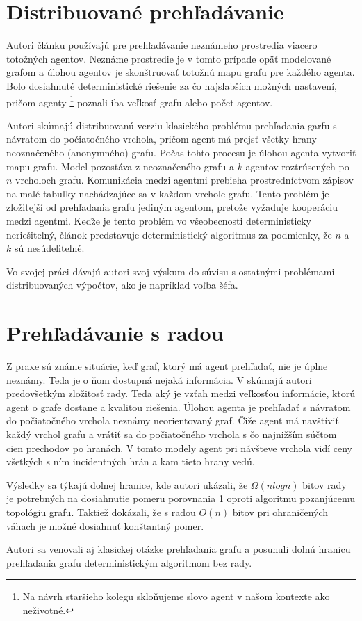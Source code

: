\section{Distribuované prehľadávanie}
Autori článku \cite{DEA} používajú pre prehľadávanie neznámeho prostredia
viacero totožných agentov. Neznáme prostredie je v tomto prípade opäť
modelované grafom a úlohou agentov je skonštruovať totožnú mapu grafu pre
každého agenta. Bolo dosiahnuté deterministické riešenie za čo najslabších možných
nastavení, pričom agenty \footnote{Na návrh staršieho kolegu skloňujeme
slovo agent v našom kontexte ako neživotné.} poznali iba veľkosť grafu alebo
počet agentov.

Autori skúmajú distribuovanú verziu
klasického problému prehľadania garfu s návratom do počiatočného vrchola,
pričom agent má prejsť všetky hrany neoznačeného (anonymného) grafu. Počas
tohto procesu je úlohou agenta vytvoriť mapu grafu. Model pozostáva z
neoznačeného grafu a $k$ agentov roztrúsených po $n$ vrcholoch grafu.
Komunikácia medzi agentmi prebieha prostredníctvom zápisov na malé tabuľky
nachádzajúce sa v každom vrchole grafu. Tento problém je zložitejší od
prehľadania grafu jediným agentom, pretože vyžaduje kooperáciu medzi
agentmi. Keďže je tento problém vo všeobecnosti deterministicky
neriešiteľný, článok predstavuje deterministický algoritmus za podmienky, že
$n$ a $k$ sú nesúdeliteľné.

Vo svojej práci dávajú autori
svoj výskum do súvisu s ostatnými problémami distribuovaných výpočtov, ako
je napríklad voľba šéfa.

\section{Prehľadávanie s radou}
Z praxe sú známe situácie, keď graf, ktorý má agent prehľadať, nie je úplne
neznámy. Teda je o ňom dostupná nejaká informácia. V \cite{Kral} skúmajú
autori predovšetkým zložitosť rady. Teda aký je vzťah medzi veľkosťou
informácie, ktorú agent o grafe dostane a kvalitou riešenia. Úlohou agenta
je prehľadať s návratom do počiatočného vrchola neznámy neorientovaný graf.
Čiže agent má navštíviť každý vrchol grafu a vrátiť sa do počiatočného
vrchola s čo najnižším súčtom cien prechodov po hranách. V tomto modely
agent pri návšteve vrchola vidí ceny všetkých s ním incidentných hrán a kam
tieto hrany vedú.

Výsledky sa týkajú dolnej hranice, kde autori ukázali, že $\Omega (n log n)$
bitov rady je potrebných na dosiahnutie pomeru porovnania 1 oproti algoritmu
pozanjúcemu topológiu grafu. Taktiež dokázali, že s radou $O(n)$ bitov pri
ohraničených váhach je možné dosiahnuť konštantný pomer.

Autori sa venovali aj klasickej otázke prehľadania grafu a posunuli dolnú
hranicu prehľadania grafu deterministickým algoritmom bez rady.
